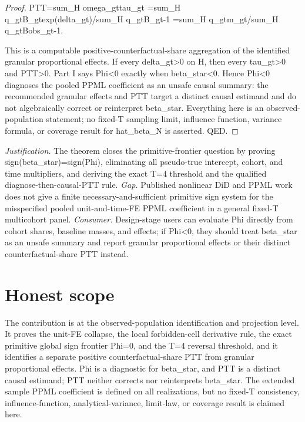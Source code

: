 \documentclass{article}
\begin{document}
\begin{proof}
  PTT=sum_H omega_{gt}tau_{gt}
     ={sum_H q_{gt}B_{gt}exp(delta_{gt})}/{sum_H q_{gt}B_{gt}}-1
     ={sum_H q_{gt}m_{gt}}/{sum_H q_{gt}Bobs_{gt}}-1.

This is a computable positive-counterfactual-share aggregation of the identified granular proportional effects. If every delta_{gt}>0 on H, then every tau_{gt}>0 and PTT>0. Part I says Phi<0 exactly when beta_star<0. Hence Phi<0 diagnoses the pooled PPML coefficient as an unsafe causal summary: the recommended granular effects and PTT target a distinct causal estimand and do not algebraically correct or reinterpret beta_star. Everything here is an observed-population statement; no fixed-T sampling limit, influence function, variance formula, or coverage result for hat_beta_N is asserted. QED.
\end{proof}
\par\smallskip\noindent \textit{Justification.} The theorem closes the primitive-frontier question by proving sign(beta_star)=sign(Phi), eliminating all pseudo-true intercept, cohort, and time multipliers, and deriving the exact T=4 threshold and the qualified diagnose-then-causal-PTT rule. \textit{Gap.} Published nonlinear DiD and PPML work does not give a finite necessary-and-sufficient primitive sign system for the misspecified pooled unit-and-time-FE PPML coefficient in a general fixed-T multicohort panel. \textit{Consumer.} Design-stage users can evaluate Phi directly from cohort shares, baseline masses, and effects; if Phi<0, they should treat beta_star as an unsafe summary and report granular proportional effects or their distinct counterfactual-share PTT instead.

\section{Honest scope}

The contribution is at the observed-population identification and projection level. It proves the unit-FE collapse, the local forbidden-cell derivative rule, the exact primitive global sign frontier Phi=0, and the T=4 reversal threshold, and it identifies a separate positive counterfactual-share PTT from granular proportional effects. Phi is a diagnostic for beta_star, and PTT is a distinct causal estimand; PTT neither corrects nor reinterprets beta_star. The extended sample PPML coefficient is defined on all realizations, but no fixed-T consistency, influence-function, analytical-variance, limit-law, or coverage result is claimed here.
\end{document}
